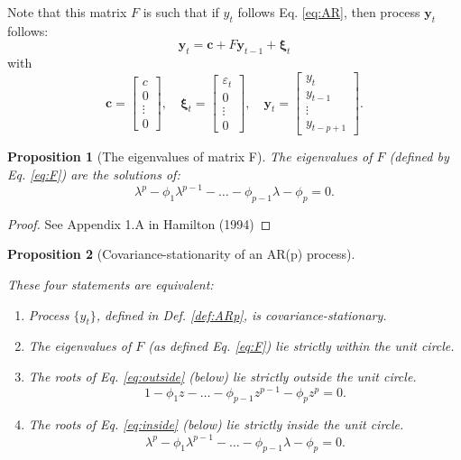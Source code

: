 \documentclass[
  11pt,
]{book}
\providecommand{\tightlist}{%
  \setlength{\itemsep}{0pt}\setlength{\parskip}{0pt}}
\newtheorem{proposition}{Proposition}[chapter]
\theoremstyle{definition}
\theoremstyle{definition}
\theoremstyle{definition}
\theoremstyle{definition}
\theoremstyle{remark}
\begin{document}
Note that this matrix \(F\) is such that if \(y_t\) follows Eq. \eqref{eq:AR}, then process \(\mathbf{y}_t\) follows:
\[
\mathbf{y}_t = \mathbf{c} + F \mathbf{y}_{t-1} + \boldsymbol\xi_t
\]
with
\[
\mathbf{c} =
\left[\begin{array}{c}
c\\
0\\
\vdots\\
0
\end{array}\right],
\quad
\boldsymbol\xi_t =
\left[\begin{array}{c}
\varepsilon_t\\
0\\
\vdots\\
0
\end{array}\right],
\quad
\mathbf{y}_t =
\left[\begin{array}{c}
y_t\\
y_{t-1}\\
\vdots\\
y_{t-p+1}
\end{array}\right].
\]

\begin{proposition}[The eigenvalues of matrix F]
\protect\hypertarget{prp:Feigen}{}\label{prp:Feigen}The eigenvalues of \(F\) (defined by Eq. \eqref{eq:F}) are the solutions of:
\begin{equation}
\lambda^p - \phi_1 \lambda^{p-1} - \dots - \phi_{p-1}\lambda - \phi_p = 0.\label{eq:Feigen}
\end{equation}
\end{proposition}

\begin{proof}
See Appendix 1.A in Hamilton (1994)
\end{proof}

\begin{proposition}[Covariance-stationarity of an AR(p) process]
\protect\hypertarget{prp:stability}{}\label{prp:stability}

These four statements are equivalent:

\begin{enumerate}
\def\labelenumi{\roman{enumi}.}
\tightlist
\item
  Process \(\{y_t\}\), defined in Def. \ref{def:ARp}, is covariance-stationary.
\item
  The eigenvalues of \(F\) (as defined Eq. \eqref{eq:F}) lie strictly within the unit circle.
\item
  The roots of Eq. \eqref{eq:outside} (below) lie strictly outside the unit circle.
  \begin{equation}
  1 - \phi_1 z - \dots - \phi_{p-1}z^{p-1} - \phi_p z^p = 0.\label{eq:outside}
  \end{equation}
\item
  The roots of Eq. \eqref{eq:inside} (below) lie strictly inside the unit circle.
  \begin{equation}
  \lambda^p - \phi_1 \lambda^{p-1} - \dots - \phi_{p-1}\lambda - \phi_p = 0.\label{eq:inside}
  \end{equation}
\end{enumerate}

\end{proposition}
\end{document}
